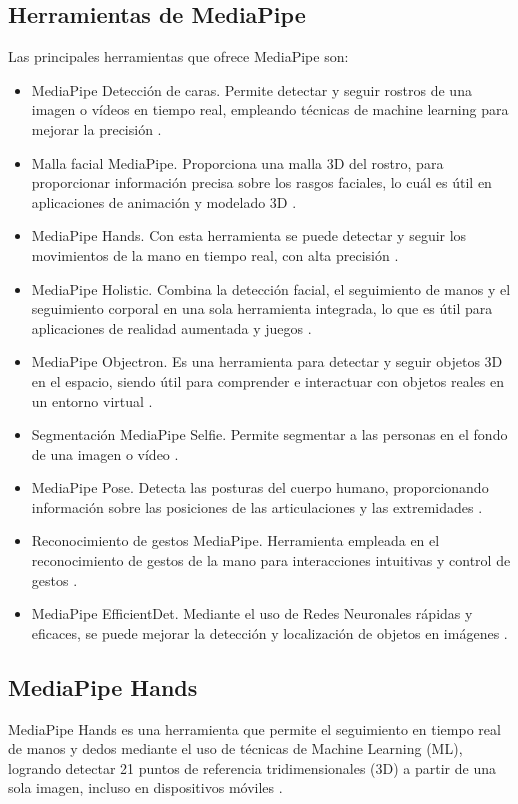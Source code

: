 \subsection{Herramientas de MediaPipe}
Las principales herramientas que ofrece MediaPipe son:
\begin{itemize}
    \item MediaPipe Detección de caras. Permite detectar y seguir rostros de una imagen o vídeos en tiempo real, empleando técnicas de machine learning para mejorar la precisión \cite{ref49}.
    \item Malla facial MediaPipe. Proporciona una malla 3D del rostro, para proporcionar información precisa sobre los rasgos faciales, lo cuál es útil en aplicaciones de animación y modelado 3D \cite{ref49}.
    \item MediaPipe Hands. Con esta herramienta se puede detectar y seguir los movimientos de la mano en tiempo real, con alta precisión \cite{ref49}.
    \item MediaPipe Holistic. Combina la detección facial, el seguimiento de manos y el seguimiento corporal en una sola herramienta integrada, lo que es útil para aplicaciones de realidad aumentada y juegos \cite{ref49}.
    \item MediaPipe Objectron. Es una herramienta para detectar y seguir objetos 3D en el espacio, siendo útil para comprender e interactuar con objetos reales en un entorno virtual \cite{ref49}.
    \item Segmentación MediaPipe Selfie. Permite segmentar a las personas en el fondo de una imagen o vídeo \cite{ref49}.
    \item MediaPipe Pose. Detecta las posturas del cuerpo humano, proporcionando información sobre las posiciones de las articulaciones y las extremidades \cite{ref49}.
    \item Reconocimiento de gestos MediaPipe. Herramienta empleada en el reconocimiento de gestos de la mano para interacciones intuitivas y control de gestos \cite{ref49}.
    \item MediaPipe EfficientDet. Mediante el uso de Redes Neuronales rápidas y eficaces, se puede mejorar la detección y localización de objetos en imágenes \cite{ref49}. 

\end{itemize}

\newpage
\subsection{MediaPipe Hands}
MediaPipe Hands es una herramienta que permite el seguimiento en tiempo real de manos y dedos mediante el uso de técnicas de Machine Learning (ML), logrando detectar 21 puntos de referencia tridimensionales (3D) a partir de una sola imagen, incluso en dispositivos móviles \cite{ref51}.\\

